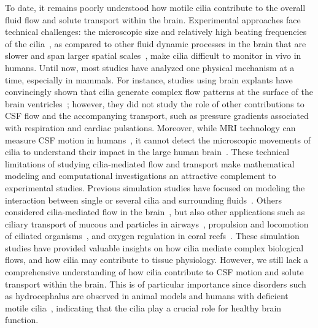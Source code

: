\documentclass{WileyMSP-template}
\begin{document}
To date, it remains poorly understood how motile cilia contribute to 
the overall fluid flow and solute transport within the brain.
Experimental approaches face technical challenges: the microscopic size and relatively 
high beating frequencies of the cilia~\cite{ocallaghan2012analysis, mahuzier2018ependymal,
Jeong2022MeasurementTelencephalon, Olstad2019CiliaryDevelopment, spassky2013motile, DGama2021Diversity},
as compared to other fluid dynamic processes in the brain that are slower and span larger
spatial scales~\cite{Vinje2019RespiratoryMeasurements, eide2024functional, fultz2019coupled, mestre2018flow},
make cilia difficult to monitor in vivo in humans.
Until now, most studies have analyzed one physical mechanism at a time, especially in mammals.
For instance, studies using brain explants have convincingly shown
that cilia generate complex flow patterns at the surface of the brain
ventricles~\cite{Faubel2016Cilia-basedVentricles, Sawamoto2006NewBrain, ibanez2003beat};
however, they did not study the role of other contributions to CSF
flow and the accompanying transport, such as pressure
gradients associated with respiration and cardiac pulsations. Moreover, while MRI technology
can measure CSF motion in humans~\cite{feinberg1987human, battal2011cerebrospinal,
yamada2015current}, it cannot detect the microscopic
movements of cilia to understand their impact in the large human
brain~\cite{Siyahhan2014FlowVentricles}. 
These technical limitations of studying cilia-mediated flow and transport make 
mathematical modeling and computational investigations an attractive complement to experimental
studies. Previous simulation studies have focused on modeling the interaction
between single or several cilia and surrounding
fluids~\cite{Guo2020SimulatingGeometries, Ruvalcaba2021NumericalTree, Smith2009MathematicalFluids,
Cui2019NumericalMethod, Cui2022AFlow}.
Others considered cilia-mediated flow in the brain~\cite{Siyahhan2014FlowVentricles,
Yoshida2022EffectVentricles, Salman2022ComputationalEmbryo, Thouvenin2020OriginCanal}, but also 
other applications such as ciliary transport of mucous and particles in
airways~\cite{Fulford1986Muco-ciliaryLung, Ramirez-SanJuan2020Multi-scaleArrays, roth2025structure},
propulsion and locomotion of ciliated organisms~\cite{BLAKE1974MechanicsMotion,
Jahn1972LocomotionProtozoa, Brennen1977FluidFlagella}, and
oxygen regulation in coral reefs~\cite{Pacherres2022CiliaryProduction}.
These simulation studies have provided valuable insights on how cilia mediate complex
biological flows, and how cilia may contribute to tissue physiology.
However, we still lack a comprehensive understanding of how
cilia contribute to CSF motion and solute transport within the brain.
This is of particular importance since disorders such as hydrocephalus are observed
in animal models and humans with deficient motile cilia~\cite{Afzelius2004CiliaRelatedDiseases,
Olstad2019CiliaryDevelopment, Mitchison2017Motile, Ibanez-Tallon2002LossHydrocephalus},
indicating that the cilia play a crucial role for healthy brain function. 
\end{document}
